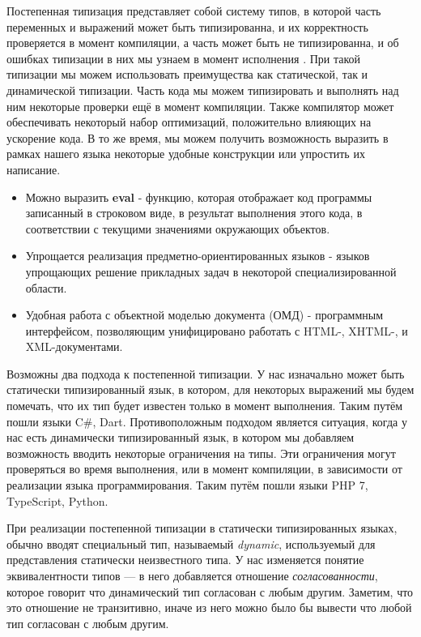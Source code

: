 Постепенная типизация представляет собой систему типов, в которой часть переменных и выражений может быть типизированна, и их корректность проверяется в момент компиляции, а часть может быть не типизированна, и об ошибках типизации в них мы узнаем в момент исполнения \cite{gradual:siek2006gradual} \cite{gradual:siek2007gradual}. При такой типизации мы можем использовать преимущества как статической, так и динамической типизации. Часть кода мы можем типизировать и выполнять над ним некоторые проверки ещё в момент компиляции. Также компилятор может обеспечивать некоторый набор оптимизаций, положительно влияющих на ускорение кода. В то же время, мы можем получить возможность выразить в рамках нашего языка некоторые удобные конструкции или упростить их написание.

\begin{itemize}
    \item Можно выразить \textbf{eval} - функцию, которая отображает код программы записанный в строковом виде, в результат выполнения этого кода, в соответствии с текущими значениями окружающих объектов.
    \item Упрощается реализация предметно-ориентированных языков - языков упрощающих решение прикладных задач в некоторой специализированной области.
    \item Удобная работа с объектной моделью документа (ОМД) - программным интерфейсом, позволяющим унифицировано работать с HTML-, XHTML-, и XML-документами.
\end{itemize}

Возможны два подхода к постепенной типизации. У нас изначально может быть статически типизированный язык, в котором, для некоторых выражений мы будем помечать, что их тип будет известен только в момент выполнения. Таким путём пошли языки C{\#}, Dart. Противоположным подходом является ситуация, когда у нас есть динамически типизированный язык, в котором мы добавляем возможность вводить некоторые ограничения на типы. Эти ограничения могут проверяться во время выполнения, или в момент компиляции, в зависимости от реализации языка программирования. Таким путём пошли языки PHP 7, TypeScript, Python.

При реализации постепенной типизации в статически типизированных языках, обычно вводят специальный тип, называемый \textit{dynamic}, используемый для представления статически неизвестного типа. У нас изменяется понятие эквивалентности типов --- в него добавляется отношение \textit{согласованности}, которое говорит что динамический тип согласован с любым другим. Заметим, что это отношение не транзитивно, иначе из него можно было бы вывести что любой тип согласован с любым другим.


